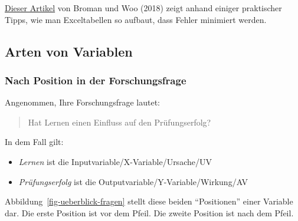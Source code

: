 \documentclass[
  a4paper,
  DIV=11]{scrreprt}
\providecommand{\tightlist}{%
  \setlength{\itemsep}{0pt}\setlength{\parskip}{0pt}}\usepackage{longtable,booktabs,array}
\theoremstyle{definition}
\theoremstyle{definition}
\theoremstyle{remark}
\begin{document}
\href{https://www.tandfonline.com/doi/full/10.1080/00031305.2017.1375989}{Dieser
Artikel} von Broman und Woo (2018) zeigt anhand einiger praktischer
Tipps, wie man Exceltabellen so aufbaut, dass Fehler minimiert werden.

\hypertarget{arten-von-variablen}{%
\subsection{Arten von Variablen}\label{arten-von-variablen}}

\hypertarget{nach-position-in-der-forschungsfrage}{%
\subsubsection{Nach Position in der
Forschungsfrage}\label{nach-position-in-der-forschungsfrage}}

Angenommen, Ihre Forschungsfrage lautet:

\begin{quote}
Hat Lernen einen Einfluss auf den Prüfungserfolg?
\end{quote}

In dem Fall gilt:

\begin{itemize}
\tightlist
\item
  \emph{Lernen} ist die Inputvariable/X-Variable/Ursache/UV
\item
  \emph{Prüfungserfolg} ist die Outputvariable/Y-Variable/Wirkung/AV
\end{itemize}

Abbildung~\ref{fig-ueberblick-fragen} stellt diese beiden ``Positionen''
einer Variable dar. Die erste Position ist vor dem Pfeil. Die zweite
Position ist nach dem Pfeil.
\end{document}
